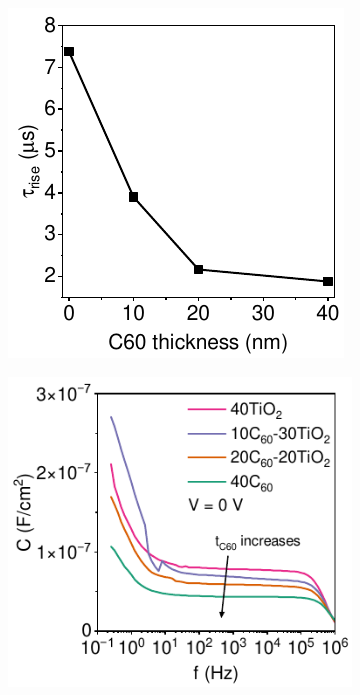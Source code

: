\begin{figure}[t]
\begin{subfigure}[t]{0.4\textwidth}
        \includegraphics[width=\textwidth]{chapters/transport_layers/images/Rise_time_f_c60_thickness.pdf} 
        \caption{}
        \label{}
    \end{subfigure} 
    \begin{subfigure}[t]{0.48\textwidth}
        \centering
        \hspace{-1.5cm}
        \includegraphics[width=\textwidth]{chapters/transport_layers/images/Cf_comparison.pdf} %

\end{subfigure}
\end{figure}
